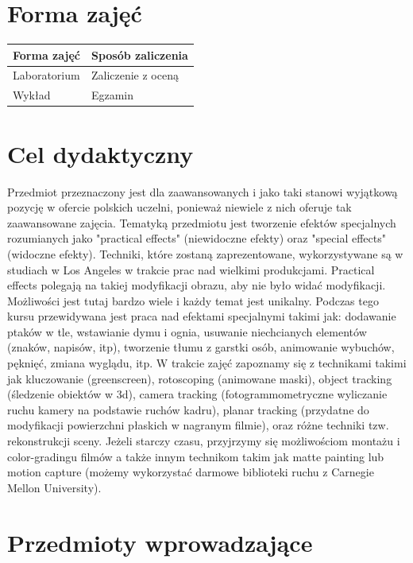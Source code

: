 \documentclass[12pt, a4paper]{article}
\begin{document}
\section{Forma zajęć}

\begin{tabular}{ll}
  \hline
  \textbf{Forma zajęć} & \textbf{Sposób zaliczenia} \\
  \hline
  Laboratorium & Zaliczenie z oceną \\
  Wykład & Egzamin \\
  \hline
\end{tabular}

\section{Cel dydaktyczny}

Przedmiot przeznaczony jest dla zaawansowanych i jako taki stanowi wyjątkową pozycję w ofercie polskich uczelni, ponieważ niewiele z nich oferuje tak zaawansowane zajęcia. Tematyką przedmiotu jest tworzenie efektów specjalnych rozumianych jako "practical effects" (niewidoczne efekty) oraz "special effects" (widoczne efekty). Techniki, które zostaną zaprezentowane, wykorzystywane są w studiach w Los Angeles w trakcie prac nad wielkimi produkcjami. Practical effects polegają na takiej modyfikacji obrazu, aby nie było widać modyfikacji. Możliwości jest tutaj bardzo wiele i każdy temat jest unikalny. Podczas tego kursu przewidywana jest praca nad efektami specjalnymi takimi jak: dodawanie ptaków w tle, wstawianie dymu i ognia, usuwanie niechcianych elementów (znaków, napisów, itp), tworzenie tłumu z garstki osób, animowanie wybuchów, pęknięć, zmiana wyglądu, itp. W trakcie zajęć zapoznamy się z technikami takimi jak kluczowanie (greenscreen), rotoscoping (animowane maski), object tracking (śledzenie obiektów w 3d), camera tracking (fotogrammometryczne wyliczanie ruchu kamery na podstawie ruchów kadru), planar tracking (przydatne do modyfikacji powierzchni płaskich w nagranym filmie), oraz różne techniki tzw. rekonstrukcji sceny. Jeżeli starczy czasu, przyjrzymy się możliwościom montażu i color-gradingu filmów a także innym technikom takim jak matte painting lub motion capture (możemy wykorzystać darmowe biblioteki ruchu z Carnegie Mellon University).

\section{Przedmioty wprowadzające}
\end{document}
